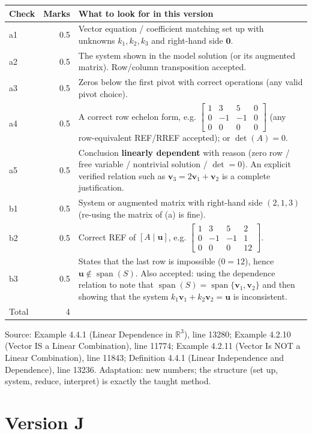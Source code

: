 \documentclass[11pt,a4paper]{article}
\newcommand{\Src}[1]{{\footnotesize\color{black!65}Source: #1}}
\begin{document}
\begin{tabularx}{\linewidth}{@{}l r >{\raggedright\arraybackslash}X@{}}\toprule Check & Marks & What to look for in this version\\\midrule
a1 & 0.5 & Vector equation / coefficient matching set up with unknowns $k_1,k_2,k_3$ and right-hand side $\mathbf{0}$.\\
a2 & 0.5 & The system shown in the model solution (or its augmented matrix). Row/column transposition accepted.\\
a3 & 0.5 & Zeros below the first pivot with correct operations (any valid pivot choice).\\
a4 & 0.5 & A correct row echelon form, e.g. $\left[\begin{array}{ccc|c} 1 & 3 & 5 & 0 \\ 0 & -1 & -1 & 0 \\ 0 & 0 & 0 & 0 \end{array}\right]$ (any row-equivalent REF/RREF accepted); or $\det(A)=0$.\\
a5 & 0.5 & Conclusion \textbf{linearly dependent} with reason (zero row / free variable / nontrivial solution / $\det=0$). An explicit verified relation such as $\mathbf{v}_3=2\mathbf{v}_1+\mathbf{v}_2$ is a complete justification.\\
b1 & 0.5 & System or augmented matrix with right-hand side $(2,1,3)$ (re-using the matrix of (a) is fine).\\
b2 & 0.5 & Correct REF of $[A\mid\mathbf{u}]$, e.g. $\left[\begin{array}{ccc|c} 1 & 3 & 5 & 2 \\ 0 & -1 & -1 & 1 \\ 0 & 0 & 0 & 12 \end{array}\right]$.\\
b3 & 0.5 & States that the last row is impossible ($0=12$), hence $\mathbf{u}\notin\operatorname{span}(S)$. Also accepted: using the dependence relation to note that $\operatorname{span}(S)=\operatorname{span}\{\mathbf{v}_1,\mathbf{v}_2\}$ and then showing that the system $k_1\mathbf{v}_1+k_2\mathbf{v}_2=\mathbf{u}$ is inconsistent.\\
\midrule Total & 4 & \\\bottomrule\end{tabularx}
\Src{Example 4.4.1 (Linear Dependence in $\mathbb{R}^3$), line 13280; Example 4.2.10 (Vector IS a Linear Combination), line 11774; Example 4.2.11 (Vector Is NOT a Linear Combination), line 11843; Definition 4.4.1 (Linear Independence and Dependence), line 13236. Adaptation: new numbers; the structure (set up, system, reduce, interpret) is exactly the taught method.}\par
\clearpage\section*{Version J}
\end{document}
